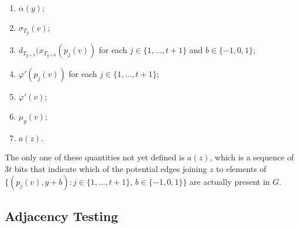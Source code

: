 \documentclass[kpfonts]{patmorin}
\begin{document}
\begin{enumerate}[(PC1)]
  \item $\alpha(y)$; %
  \item $\sigma_{T_y}(v)$; %
  \item $d_{T_{y+b}}(x_{T_{y+b}}(p_j(v))$ for each $j\in\{1,\ldots,t+1\}$ and $b\in\{-1,0,1\}$; 
  \item $\varphi'(p_j(v))$ for each $j\in\{1,\ldots,t+1\}$;
  \item $\varphi'(v)$;
  \item $\mu_y(v)$;
  \item $a(z)$.
\end{enumerate}
The only one of these quantities not yet defined is $a(z)$, which is a sequence of $3t$ bits that indicate which of the potential edges joining $z$ to elements of $\{(p_j(v),y+b): j\in\{1,\ldots,t+1\},\, b\in\{-1,0,1\}\}$ are actually present in $G$.

\subsection{Adjacency Testing}
\end{document}
